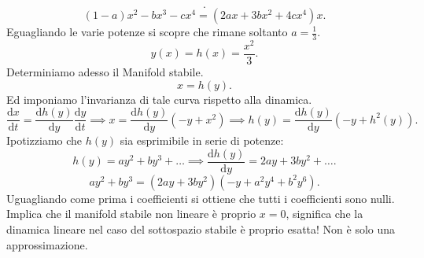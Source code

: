 \begin{exmp}[]
\[    .\] 
    \[
	(1-a)x^2 - bx^3 - cx^4 = (2ax + 3bx^2+ 4cx^4 )x
    .\] 
    Eguagliando le varie potenze si scopre che rimane soltanto $a = \frac{1}{3}$.
    \[
	y(x) = h(x) = \frac{x^2}{3}
    .\] 
    Determiniamo adesso il Manifold stabile. 
    \[
	x = h(y) 
    .\] 
    Ed imponiamo l'invarianza di tale curva rispetto alla dinamica.
    \[
	\frac{\text{d} x}{\text{d} t} = \frac{\text{d} h(y) }{\text{d} y} \frac{\text{d} y}{\text{d} t} \implies 
	x = \frac{\text{d} h(y) }{\text{d} y} (-y+ x^2) \implies 
	h(y) = \frac{\text{d} h(y) }{\text{d} y} (-y+ h^2(y) )
    .\] 
    Ipotizziamo che $h(y) $ sia esprimibile in serie di potenze:
    \[
	h(y) = ay^2 + by^3+ \ldots \implies  \frac{\text{d} h(y) }{\text{d} y} = 2ay + 3by^2 +\ldots
    .\] 
    \[
	ay^2 + by^3 = (2ay + 3by^2) (-y + a^2y^4 + b^2y^6) 
    .\] 
    Uguagliando come prima i coefficienti si ottiene che tutti i coefficienti sono nulli.\\
    Implica che il manifold stabile non lineare è proprio $x = 0$, significa che la dinamica lineare nel caso del sottospazio stabile è proprio esatta! Non è solo una approssimazione.
\end{exmp}
\noindent

